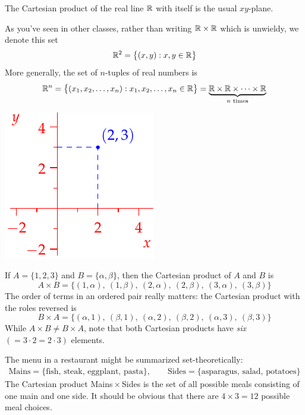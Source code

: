 \begin{examples}{}{}
	\exstart The Cartesian product of the real line $\mathbb{R}$ with itself is the usual $xy$-plane.
	\begin{enumerate}\setcounter{enumi}{1}
	\begin{minipage}[t]{0.7\linewidth}\vspace{-8pt}
		\item[]As you've seen in other classes, rather than writing $\mathbb{R}\times\mathbb{R}$ which is unwieldy, we denote this set
		\[
			\mathbb{R}^2=\bigl\{(x,y):x,y\in\mathbb{R}\bigr\}
		\]
		More generally, the set of $n$-tuples of real numbers is\footnotemark
		\[
			\mathbb{R}^n=\bigl\{(x_1,x_2,\ldots,x_n):x_1,x_2,\ldots,x_n\in\mathbb{R}\bigr\} =\underbrace{\mathbb{R}\times\mathbb{R}\times\cdots\times\mathbb{R}}_{\text{$n$ times}}
		\]
	\end{minipage}
	\hfill
	\begin{minipage}[t]{0.29\linewidth}\vspace{-8pt}
		\flushright\includegraphics{setsii-cartesianplane}
	\end{minipage}

		\item If $A=\{1,2,3\}$ and $B=\{\alpha,\beta\}$, then the Cartesian product of $A$ and $B$ is
		\[
			A\times B=\bigl\{(1,\alpha),\ (1,\beta),\ (2,\alpha),\ (2,\beta),\ (3,\alpha),\ (3,\beta)\bigr\}
		\]
		The order of terms in an ordered pair really matters: the Cartesian product with the roles reversed is 
		\[
			B\times A=\bigl\{(\alpha,1),\ (\beta,1),\ (\alpha,2),\ (\beta,2),\ (\alpha,3),\ (\beta,3)\bigr\}
		\]
		While $A\times B\neq B\times A$, note that both Cartesian products have \emph{six} $(=3\cdot 2=2\cdot 3)$ elements.
		
		\item The menu in a restaurant might be summarized set-theoretically:
		\begin{gather*}
			\text{Mains}=\{\text{fish, steak, eggplant, pasta}\}, \qquad \text{Sides}=\{\text{asparagus, salad, potatoes}\}
		\end{gather*}
		The Cartesian product Mains\,$\times$\,Sides is the set of all possible meals consisting of one main and one side. It should be obvious that there are $4\times 3=12$ possible meal choices.
	\end{enumerate}
\end{examples}

